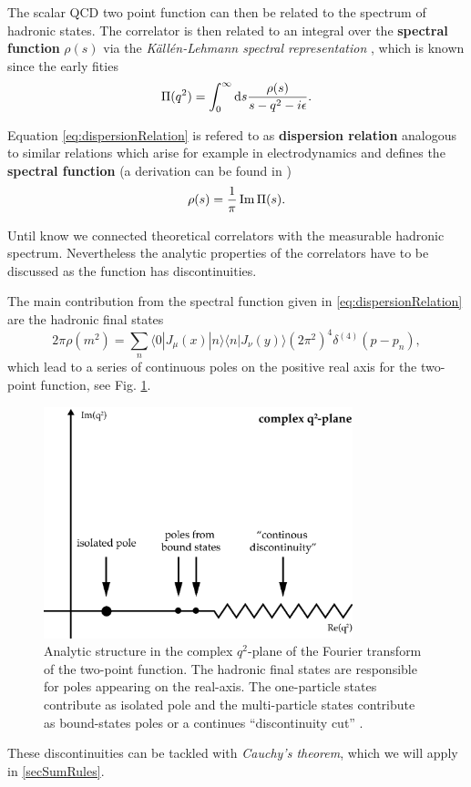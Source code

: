 \documentclass[../../index.tex]{subfiles}
\begin{document}
The scalar QCD two point function can then be related to the spectrum of
hadronic states. The correlator is then related to an integral over the
\textbf{spectral function} $\rho(s)$ via the \textit{Källén-Lehmann spectral
  representation} \cite{Kallen1952,Lehmann1954}, which is known since the early
fities
\begin{equation}
  \label{eq:dispersionRelation}
  \Pi(q^2) = \int_0^\infty \dif s \frac{\rho(s)}{s - q^2 - i \epsilon}.
\end{equation}

Equation \ref{eq:dispersionRelation} is refered to as \textbf{dispersion
  relation} analogous to similar relations which arise for example in
electrodynamics and defines the \textbf{spectral function} (a derivation can be
found in \cite{Rafael1997})
\begin{equation}
  \label{eq:spectralFunction}
  \rho(s) = \frac{1}{\pi} \operatorname{Im} \Pi(s).
\end{equation}

Until know we connected theoretical correlators with the measurable hadronic
spectrum. Nevertheless the analytic properties of the correlators have to be
discussed as the function has discontinuities.

The main contribution from the spectral function given in
\cref{eq:dispersionRelation} are the hadronic final states
\begin{equation}
  2 \pi \rho(m^2) = \sum_n \langle  0 | J_\mu(x) | n \rangle \langle n | J_\nu(y) \rangle (2 \pi^2)^4 \delta^{(4)}(p - p_n),
\end{equation}
which lead to a series of continuous poles on the positive real axis for the
two-point function, see Fig. \ref{fig:analyticStructureCorrelator}.
\begin{figure}[h]
  \centering
  \includegraphics[width=0.8\textwidth]{./images/analyticStructureCorrelator.eps}
  \caption{Analytic structure in the complex $q^2$-plane of the Fourier
    transform of the two-point function. The hadronic final states are
    responsible for poles appearing on the real-axis. The one-particle states
    contribute as isolated pole and the multi-particle states contribute as
    bound-states poles or a continues ``discontinuity cut'' \cite{Peskin1995}.}
  \label{fig:analyticStructureCorrelator}
\end{figure}
These discontinuities can be tackled with \textit{Cauchy's theorem}, which we
will apply in \cref{secSumRules}.
\end{document}

